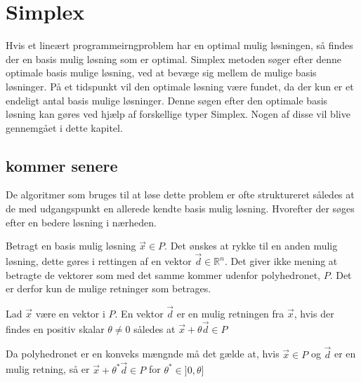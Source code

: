 \chapter{Simplex} \label{afsnit:simplex}

Hvis et lineært programmeirngproblem har en optimal mulig løsningen, så findes der en basis mulig løsning som er optimal. 
Simplex metoden søger efter denne optimale basis mulige løsning, ved at bevæge sig mellem de mulige basis løsninger. 
På et tidspunkt vil den optimale løsning være fundet, da der kun er et endeligt antal basis mulige løsninger. 
Denne søgen efter den optimale basis løsning kan gøres ved hjælp af forskellige typer Simplex. 
Nogen af disse vil blive gennemgået i dette kapitel. 

\section{kommer senere}
De algoritmer som bruges til at løse dette problem er ofte struktureret således at de med udgangspunkt en allerede kendte basis mulig løsning. Hvorefter der søges efter en bedere løsning i nærheden. 

Betragt en basis mulig løsning $\vec{x} \in P$. 
Det ønskes at rykke til en anden mulig løsning, dette gøres i rettingen af en vektor $\vec{d} \in \mathds{R}^n$. Det giver ikke mening at betragte de vektorer som med det samme kommer udenfor polyhedronet, $P$. Det er derfor kun de mulige retninger som betrages. 

\begin{defn}
Lad $\vec{x}$ være en vektor i $P$. En vektor $\vec{d}$ er en mulig retningen fra $\vec{x}$, hvis der findes en positiv skalar $\theta\neq 0$ således at $\vec{x}+\theta\vec{d} \in P$ 
\end{defn}

Da polyhedronet er en konveks mængnde må det gælde at, hvis $\vec{x} \in P$ og $\vec{d}$ er en mulig retning, så er $\vec{x}+ \theta^{*} \vec{d} \in P$ for $\theta^{*} \in ] 0,\theta ] $
